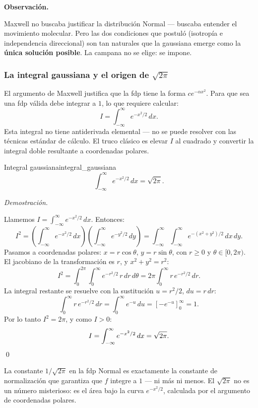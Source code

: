 \documentclass[12pt, a4paper]{book}
\newenvironment{observacion}{%
    \par\medskip\noindent\textbf{\color{azul}Observaci\'{o}n.}\enspace\itshape
}{\par\medskip}
\renewenvironment{proof}{%
    \par\medskip\noindent\textit{Demostraci\'{o}n.}\enspace
}{\qed\par\medskip}
\numberwithin{equation}{chapter}
\begin{document}
\begin{observacion}
	Maxwell no buscaba justificar la distribución Normal ---
	buscaba entender el movimiento molecular. Pero las dos
	condiciones que postuló (isotropía e independencia
	direccional) son tan naturales que la gaussiana emerge
	como la \textbf{única solución posible}. La campana no se
	elige: se impone.
\end{observacion}

\subsubsection{La integral gaussiana y el origen de $\sqrt{2\pi}$}

El argumento de Maxwell justifica que la fdp tiene la forma
$ce^{-\alpha x^2}$. Para que sea una fdp válida debe integrar
a $1$, lo que requiere calcular:
\[
I = \int_{-\infty}^{\infty} e^{-x^2/2}\,dx.
\]
Esta integral no tiene antiderivada elemental --- no se puede
resolver con las técnicas estándar de cálculo. El truco
clásico es elevar $I$ al cuadrado y convertir la integral
doble resultante a coordenadas polares.

\begin{proposicion}{Integral gaussiana}{integral_gaussiana}
	\[
	\int_{-\infty}^{\infty} e^{-x^2/2}\,dx = \sqrt{2\pi}.
	\]
\end{proposicion}

\begin{proof}
	Llamemos $I = \int_{-\infty}^{\infty} e^{-x^2/2}\,dx$.
	Entonces:
	\[
	I^2 = \left(\int_{-\infty}^{\infty} e^{-x^2/2}\,dx\right)
	\left(\int_{-\infty}^{\infty} e^{-y^2/2}\,dy\right)
	= \int_{-\infty}^{\infty}\int_{-\infty}^{\infty}
	e^{-(x^2+y^2)/2}\,dx\,dy.
	\]
	Pasamos a coordenadas polares: $x = r\cos\theta$,
	$y = r\sin\theta$, con $r \geq 0$ y $\theta \in [0, 2\pi)$.
	El jacobiano de la transformación es $r$, y
	$x^2 + y^2 = r^2$:
	\[
	I^2 = \int_0^{2\pi}\int_0^{\infty}
	e^{-r^2/2}\,r\,dr\,d\theta
	= 2\pi \int_0^{\infty} r\,e^{-r^2/2}\,dr.
	\]
	La integral restante se resuelve con la sustitución
	$u = r^2/2$, $du = r\,dr$:
	\[
	\int_0^{\infty} r\,e^{-r^2/2}\,dr
	= \int_0^{\infty} e^{-u}\,du
	= \left[-e^{-u}\right]_0^{\infty} = 1.
	\]
	Por lo tanto $I^2 = 2\pi$, y como $I > 0$:
	\[
	I = \int_{-\infty}^{\infty} e^{-x^2/2}\,dx
	= \sqrt{2\pi}. \qedhere
	\]
\end{proof}

La constante $1/\sqrt{2\pi}$ en la fdp Normal es exactamente
la constante de normalización que garantiza que $f$ integre a
$1$ --- ni más ni menos. El $\sqrt{2\pi}$ no es un número
misterioso: es el área bajo la curva $e^{-x^2/2}$, calculada
por el argumento de coordenadas polares.
\end{document}
